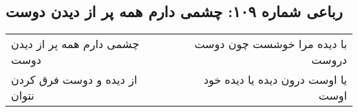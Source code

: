 \begin{center}
\section*{رباعی شماره ۱۰۹: چشمی دارم همه پر از دیدن دوست}
\label{sec:sh109}
\begin{longtable}{l p{0.5cm} r}
چشمی دارم همه پر از دیدن دوست
&&
با دیده مرا خوشست چون دوست دروست
\\
از دیده و دوست فرق کردن نتوان
&&
یا اوست درون دیده یا دیده خود اوست
\\
\end{longtable}
\end{center}

